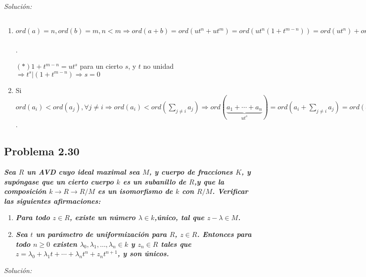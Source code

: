 \textit{Solución: }

\begin{enumerate}
\item $ord(a)=n, ord(b)=m, n<m \Rightarrow ord(a+b)=ord(ut^n+ut^m)=ord(ut^n(1+t^{m-n}))=ord(ut^n)+ord(\underbrace{1+t^{m-n}}_{(*)})=n$.

  $(*) 1+t^{m-n}=ut^s$ para un cierto $s$, y $t$ no unidad $\Rightarrow t^s|(1+t^{m-n}) \Rightarrow s=0$

\item Si $ord(a_i)<ord(a_j) ,\forall j\neq i \Rightarrow ord(a_i) < ord(\sum_{j\neq i} a_j) \Rightarrow ord(\underbrace{a_1+\cdots + a_n}_{ut^s})= ord( a_i + \sum_{j\neq i}a_j ) = ord (a_i) \Rightarrow s= ord(a_i) \Rightarrow ut^s \neq 0 \Rightarrow a_1+\cdots + a_n \neq 0$.
\end{enumerate}

\subsection{Problema 2.30}

\textit{\textbf{Sea $R$ un AVD cuyo ideal maximal sea $M$, y cuerpo de fracciones $K$, y supóngase que un cierto cuerpo $k$ es un subanillo de $R$,y que la composición $k\rightarrow R \rightarrow R/M$ es un isomorfismo de $k$ con $R/M$. Verificar las siguientes afirmaciones:}}

\begin{enumerate}
\item \textbf{\textit{Para todo $z\in R$, existe un número $\lambda \in k$,único, tal que $z-\lambda\in M$.}}
\item \textit{\textbf{Sea $t$ un parámetro de uniformización para $R$, $z\in R$. Entonces para todo $n\ge 0$ existen $\lambda_0,\lambda_1,\dots,\lambda_n\in k$ y $z_n\in R$ tales que $z=\lambda_0+\lambda_1t+\cdots +\lambda_n t^n+z_nt^{n+1}$, y son únicos.}}
\end{enumerate}

\textit{Solución:}

